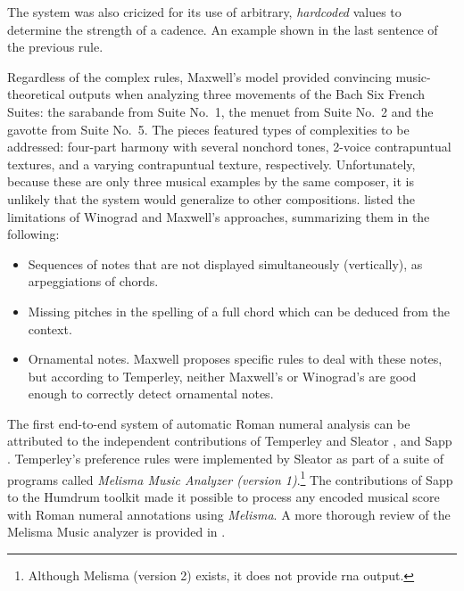 The system was also cricized for its use of arbitrary,
\emph{hardcoded} values to determine the strength of a
cadence. An example shown in the last sentence of the
previous rule.

Regardless of the complex rules, Maxwell's model provided
convincing music-theoretical outputs when analyzing three
movements of the Bach Six French Suites: the sarabande from
Suite No.~1, the menuet from Suite No.~2 and the gavotte
from Suite No.~5. The pieces featured types of complexities
to be addressed: four-part harmony with several nonchord
tones, 2-voice contrapuntual textures, and a varying
contrapuntual texture, respectively. Unfortunately, because
these are only three musical examples by the same composer,
it is unlikely that the system would generalize to other
compositions. \textcite{temperley1997algorithm} listed the
limitations of Winograd and Maxwell's approaches,
summarizing them in the following:

\begin{itemize}
    \item Sequences of notes that are not displayed
    simultaneously (vertically), as arpeggiations of chords.
    \item Missing pitches in the spelling of a full chord
    which can be deduced from the context.
    \item Ornamental notes. Maxwell proposes specific rules
    to deal with these notes, but according to Temperley,
    neither Maxwell's or Winograd's are good enough to
    correctly detect ornamental notes.
\end{itemize}


The first end-to-end system of automatic Roman numeral
analysis can be attributed to the independent contributions
of Temperley and Sleator \parencite{temperley2004cognition},
and Sapp \parencite{sapp2009tsroot}. Temperley's preference
rules were implemented by Sleator as part of a suite of
programs called \emph{Melisma Music Analyzer (version
1)}.\footnote{Although
Melisma (version 2) exists, it does not provide \gls{rna}
output.} The contributions of Sapp to the Humdrum toolkit
\parencite{huron2002music} made it possible to process any
encoded musical score with Roman numeral annotations using
\emph{Melisma}. A more thorough review of the Melisma Music
analyzer is provided in
\textcite{napoleslopez2017automatic}.


